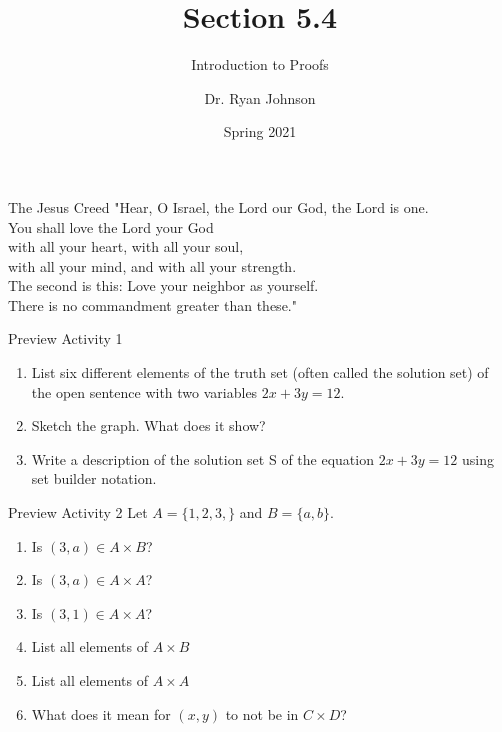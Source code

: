 \documentclass{beamer}
\title{Section 5.4}
\subtitle{Introduction to Proofs}
\author{Dr. Ryan Johnson}
\institute{Grace College}
\date{Spring 2021}
\begin{document}
\begin{frame}[plain]
    \maketitle
\end{frame}

\begin{frame}{The Jesus Creed}
\Large{
"Hear, O Israel, the Lord our God, the Lord is one.\\
You shall love the Lord your God\\
\;\; with all your heart, with all your soul,\\
\;\; with all your mind, and with all your strength.\\
The second is this: Love your neighbor as yourself.\\
There is no commandment greater than these."
}
\end{frame}

\begin{frame}[t]{Preview Activity 1}
    \begin{enumerate}
        \item List six different elements of the truth set (often called the solution set) of
the open sentence with two variables $2x+3y=12$.
        \item Sketch the graph.  What does it show?
        \item Write a description of the solution set S of the equation  $2x+3y=12$ using
set builder notation.
    \end{enumerate}
\end{frame}

\begin{frame}{Preview Activity 2}
    Let $A = \{1,2,3,\}$ and $B = \{a,b\}$.
    \begin{enumerate}
        \item Is $(3,a) \in A \times B$?
        \item Is $(3,a) \in A \times A$?
        \item Is $(3,1) \in A \times A$?
        \item List all elements of $A \times B$
        \item List all elements of $A \times A$
        \item What does it mean for $(x,y)$ to not be in $C \times D$?
    \end{enumerate}
\end{frame}
\end{document}
